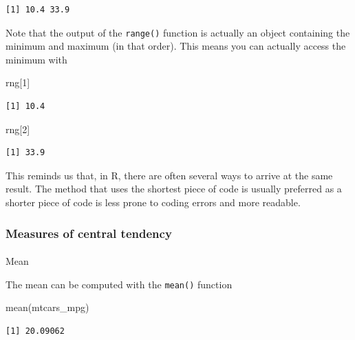 \documentclass[
  letterpaper,
  DIV=11,
  numbers=noendperiod]{scrartcl}
\makeatletter
\let\oldparagraph\paragraph
\renewcommand{\paragraph}{
    \@ifstar
      \xxxParagraphStar
      \xxxParagraphNoStar
  }
\newcommand{\xxxParagraphStar}[1]{\oldparagraph*{#1}\mbox{}}
\newcommand{\xxxParagraphNoStar}[1]{\oldparagraph{#1}\mbox{}}
\newenvironment{Shaded}{\begin{snugshade}}{\end{snugshade}}
\newcommand{\DecValTok}[1]{\textcolor[rgb]{0.68,0.00,0.00}{#1}}
\newcommand{\FunctionTok}[1]{\textcolor[rgb]{0.28,0.35,0.67}{#1}}
\newcommand{\NormalTok}[1]{\textcolor[rgb]{0.00,0.23,0.31}{#1}}
\makeatother
\begin{document}
\begin{verbatim}
[1] 10.4 33.9
\end{verbatim}

Note that the output of the \texttt{range()} function is actually an
object containing the minimum and maximum (in that order). This means
you can actually access the minimum with

\begin{Shaded}
\begin{Highlighting}[]
\NormalTok{rng[}\DecValTok{1}\NormalTok{]}
\end{Highlighting}
\end{Shaded}

\begin{verbatim}
[1] 10.4
\end{verbatim}

\begin{Shaded}
\begin{Highlighting}[]
\NormalTok{rng[}\DecValTok{2}\NormalTok{]}
\end{Highlighting}
\end{Shaded}

\begin{verbatim}
[1] 33.9
\end{verbatim}

This reminds us that, in R, there are often several ways to arrive at
the same result. The method that uses the shortest piece of code is
usually preferred as a shorter piece of code is less prone to coding
errors and more readable.

\subsubsection{Measures of central
tendency}\label{measures-of-central-tendency}

\paragraph{Mean}\label{mean}

The mean can be computed with the \texttt{mean()} function

\begin{Shaded}
\begin{Highlighting}[]
\FunctionTok{mean}\NormalTok{(mtcars\_mpg)}
\end{Highlighting}
\end{Shaded}

\begin{verbatim}
[1] 20.09062
\end{verbatim}
\end{document}
